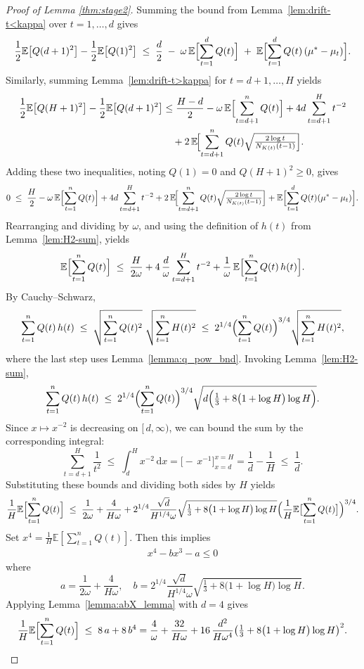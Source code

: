 \documentclass[12pt,draftcls, onecolumn]{IEEEtran}
\newcommand{\vedisc}{\omega}
\newcommand{\EE}{\mathbb{E}}
\begin{document}
{\begin{proof}[Proof of Lemma \ref{thm:stage2}]
Summing the bound from Lemma~\ref{lem:drift-t<kappa} over \(t=1,\dots,{d}\) gives
\[
\frac{1}{2}\EE\bigl[Q({d}+1)^2\bigr]-\frac{1}{2}\EE\bigl[Q(1)^2\bigr]
\;\le\;
\frac{{d}}{2}
\;-\;
\vedisc\,\EE\Bigl[\sum_{t=1}^{{d}}Q(t)\Bigr]
\;+\;
\EE\Bigl[\sum_{t=1}^{{d}}Q(t)\,(\mu^*-\mu_t)\Bigr].
\]
Similarly, summing Lemma~\ref{lem:drift-t>kappa} for \(t={d}+1,\dots,H\) yields
\[
\begin{aligned}
\frac{1}{2}\EE\bigl[Q(H+1)^2\bigr]
- \frac{1}{2}\EE\bigl[Q({d}+1)^2\bigr]
&\le
\frac{H-{d}}{2}
- \vedisc\,\EE\Bigl[\sum_{t={d}+1}^nQ(t)\Bigr]
+4{d} \sum_{t={d}+1}^H t^{-2}\\
&\quad
+2\,\EE\!\Bigl[\sum_{t={d}+1}^nQ(t)\sqrt{\tfrac{2\log t}{N_{K(t)}(t-1)}}\Bigr].
\end{aligned}
\]
Adding these two inequalities, noting \(Q(1)=0\) and \(Q(H+1)^2\ge0\), gives
\[
0
\;\le\;
\frac{H}{2}
- \vedisc\,\EE\Bigl[\sum_{t=1}^nQ(t)\Bigr]
+4{d} \sum_{t={d}+1}^H t^{-2}
+2\,\EE\!\Bigl[\sum_{t={d}+1}^nQ(t)\sqrt{\tfrac{2\log t}{N_{K(t)}(t-1)}}\Bigr]
+\EE\Bigl[\sum_{t=1}^{d} Q(t)(\mu^*-\mu_t)\Bigr].
\]
Rearranging and dividing by \(\vedisc\), and using the definition of \(h(t)\) from Lemma~\ref{lem:H2-sum}, yields
\[
\EE\Bigl[\sum_{t=1}^nQ(t)\Bigr]
\;\le\;
\frac{H}{2\vedisc}
+4\,\frac{{d} }{\vedisc}\sum_{t={d}+1}^H t^{-2}
+\frac{1}{\vedisc}\,\EE\Bigl[\sum_{t=1}^nQ(t)\,h(t)\Bigr].
\]
By Cauchy–Schwarz,
\[
\sum_{t=1}^nQ(t)\,h(t)
\;\le\;
\sqrt{\sum_{t=1}^nQ(t)^2}\;\sqrt{\sum_{t=1}^nH(t)^2}
\;\le\;
2^{1/4}\Bigl(\sum_{t=1}^nQ(t)\Bigr)^{3/4}
\sqrt{\sum_{t=1}^nH(t)^2},
\]
where the last step uses Lemma~\ref{lemma:q_pow_bnd}.  Invoking Lemma~\ref{lem:H2-sum},
\[
\sum_{t=1}^nQ(t)\,h(t)
\;\le\;
2^{1/4}\Bigl(\sum_{t=1}^nQ(t)\Bigr)^{3/4}
\sqrt{{d}\Bigl(\tfrac13+8\bigl(1+\log H\bigr)\log H\Bigr)}.
\]
Since \(x\mapsto x^{-2}\) is decreasing on \([\,{d},\infty)\), we can bound the sum by the corresponding integral:
\[
\sum_{t={d}+1}^H \frac{1}{t^2}
\;\le\;
\int_{{d}}^{H} x^{-2}\,\mathrm{d}x
=
\bigl[-\,x^{-1}\bigr]_{x={d}}^{x=H}
=
\frac{1}{d} - \frac{1}{H}
\;\le\;
\frac{1}{d}.
\]  
Substituting these bounds and dividing both sides by \(H\) yields
\[
\frac{1}{H}\EE\Bigl[\sum_{t=1}^nQ(t)\Bigr]
\;\le\;
\frac{1}{2\vedisc}
+\frac{4}{H\vedisc}
+2^{1/4}\frac{\sqrt{{d}}}{H^{1/4}\vedisc}
\sqrt{\tfrac13+8\bigl(1+\log H\bigr)\log H}
\Bigl(\frac{1}{H}\EE\bigl[\sum_{t=1}^nQ(t)\bigr]\Bigr)^{3/4}.
\]
Set \(x^4=\tfrac{1}{H}\EE[\sum_{t=1}^nQ(t)]\).  Then this implies
\begin{align*}
    x^4- b x^{3} -a
    \leq
    0
\end{align*}
where
\[
a = \frac{1}{2\vedisc}+\frac{4}{H\vedisc},
\quad
b = 2^{1/4}\frac{\sqrt{{d}}}{H^{1/4}\vedisc}
\sqrt{\tfrac{1}{3}+8\bigl(1+\log H\bigr)\log H}.
\]
Applying Lemma~\ref{lemma:abX_lemma} with \(d=4\) gives
\[
\frac{1}{H}\EE\Bigl[\sum_{t=1}^nQ(t)\Bigr]
\;\le\;
8\,a + 8\,b^4
=
\frac{4}{\vedisc}
+\frac{32}{H\vedisc}
+16\,\frac{{d}^2}{H\vedisc^4}
\bigl(\tfrac13+8\bigl(1+\log H\bigr)\log H\bigr)^2.
\]
    

\end{proof}}
\end{document}
